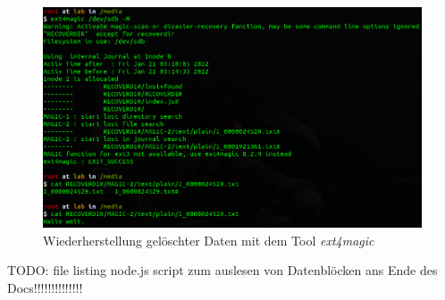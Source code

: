 \begin{figure}[H]
	\centering
	\includegraphics[width=12cm,keepaspectratio=true]{pictures/ext4magic-recovery.png}
	\caption{
		Wiederherstellung gelöschter Daten mit dem Tool \textit{ext4magic} \cite{Ext4magic.07.01.2022}
	}
	\label{fig:ext4magic}
\end{figure}


TODO: file listing node.js script zum auslesen von Datenblöcken ans Ende des Docs!!!!!!!!!!!!!!